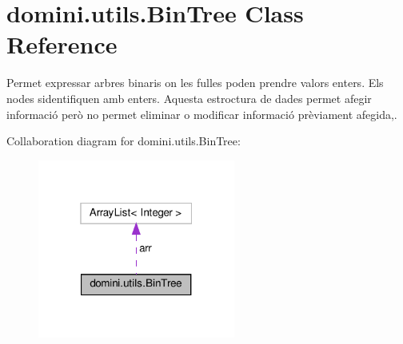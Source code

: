 \hypertarget{classdomini_1_1utils_1_1BinTree}{}\section{domini.\+utils.\+Bin\+Tree Class Reference}
\label{classdomini_1_1utils_1_1BinTree}


Permet expressar arbres binaris on les fulles poden prendre valors enters. Els nodes s\textquotesingle{}identifiquen amb enters. Aquesta estroctura de dades permet afegir informació però no permet eliminar o modificar informació prèviament afegida,.  




Collaboration diagram for domini.\+utils.\+Bin\+Tree\+:\nopagebreak
\begin{figure}[H]
\begin{center}
\leavevmode
\includegraphics[width=184pt]{classdomini_1_1utils_1_1BinTree__coll__graph}
\end{center}
\end{figure}
